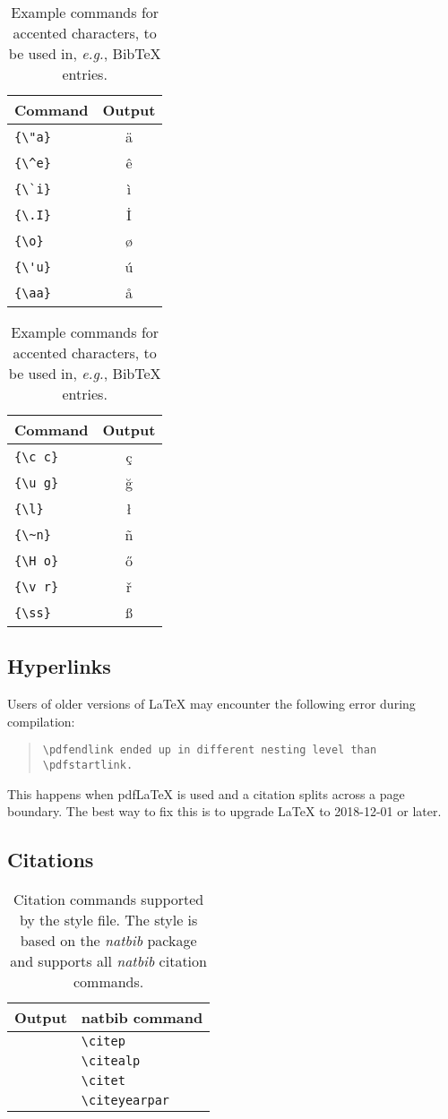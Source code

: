 \documentclass[11pt]{article}
\begin{document}
\begin{table}
\caption{Example commands for accented characters, to be used in, \emph{e.g.}, Bib\TeX{} entries.}
\label{tab:accents}
\centering
\begin{tabular}{lc}
\hline
\textbf{Command} & \textbf{Output}\\
\hline
\verb|{\"a}| & {\"a} \\
\verb|{\^e}| & {\^e} \\
\verb|{\`i}| & {\`i} \\ 
\verb|{\.I}| & {\.I} \\ 
\verb|{\o}| & {\o} \\
\verb|{\'u}| & {\'u}  \\ 
\verb|{\aa}| & {\aa}  \\\hline
\end{tabular}
\begin{tabular}{lc}
\hline
\textbf{Command} & \textbf{Output}\\
\hline
\verb|{\c c}| & {\c c} \\ 
\verb|{\u g}| & {\u g} \\ 
\verb|{\l}| & {\l} \\ 
\verb|{\~n}| & {\~n} \\ 
\verb|{\H o}| & {\H o} \\ 
\verb|{\v r}| & {\v r} \\ 
\verb|{\ss}| & {\ss} \\
\hline
\end{tabular}
\end{table}

\subsection{Hyperlinks}
Users of older versions of \LaTeX{} may encounter the following error during compilation: 
\begin{quote}
\tt\verb|\pdfendlink| ended up in different nesting level than \verb|\pdfstartlink|.
\end{quote}
This happens when pdf\LaTeX{} is used and a citation splits across a page boundary. The best way to fix this is to upgrade \LaTeX{} to 2018-12-01 or later.

\subsection{Citations}
\begin{table}
\caption{\label{citation-guide}
Citation commands supported by the style file.
The style is based on the \emph{natbib} package and supports all \emph{natbib} citation commands.}
\centering
\begin{tabular}{ll}
\hline
\textbf{Output} & \textbf{natbib command} \\
\hline
\citep{Doe23} & \verb|\citep| \\
\citealp{Doe23} & \verb|\citealp| \\
\citet{Doe23} & \verb|\citet| \\
\citeyearpar{Doe23} & \verb|\citeyearpar| \\
\hline
\end{tabular}
\end{table}
\end{document}
